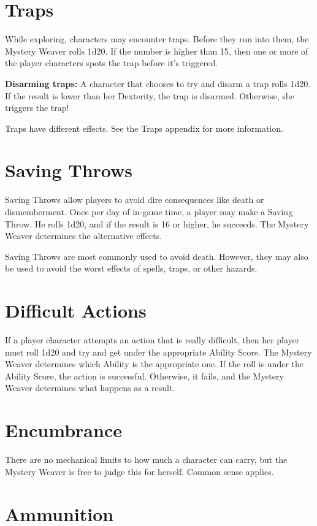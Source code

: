 \begin{multicols}{2}
\section{Traps}

While exploring, characters may encounter traps. Before they run into
them, the Mystery Weaver rolls 1d20. If the number is higher than 15, then
one or more of the player characters spots the trap before it's triggered.

\textbf{Disarming traps:} A character that chooses to try and disarm a trap
rolls 1d20. If the result is lower than her Dexterity, the trap is
disarmed. Otherwise, she triggers the trap!

Traps have different effects. See the Traps appendix for more information.

\section{Saving Throws}

Saving Throws allow players to avoid dire consequences like death or
dismemberment. Once per day of in-game time, a player may make a Saving
Throw. He rolls 1d20, and if the result is 16 or higher, he succeeds.
The Mystery Weaver determines the alternative effects.

Saving Throws are most commonly used to avoid death. However, they may
also be used to avoid the worst effects of spells, traps, or other
hazards.

\section{Difficult Actions}

If a player character attempts an action that is really difficult, then
her player must roll 1d20 and try and get under the appropriate Ability
Score. The Mystery Weaver determines which Ability is the appropriate one.
If the roll is under the Ability Score, the action is successful. Otherwise,
it fails, and the Mystery Weaver determines what happens as a result.

\section{Encumbrance}

There are no mechanical limits to how much a character can carry, but the
Mystery Weaver is free to judge this for herself. Common sense applies.

\section{Ammunition}


\end{multicols}
